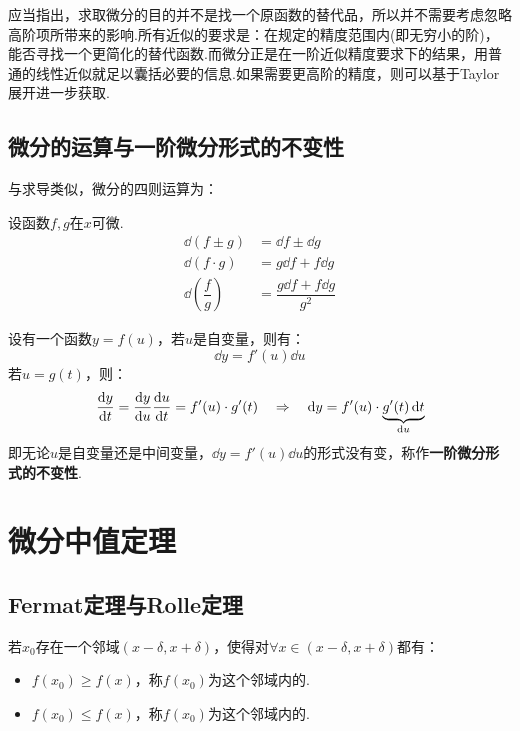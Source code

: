\begin{mistake}
    应当指出，求取微分的目的并不是找一个原函数的替代品，所以并不需要考虑忽略高阶项所带来的影响.所有近似的要求是：在规定的精度范围内(即无穷小的阶)，能否寻找一个更简化的替代函数.而微分正是在一阶近似精度要求下的结果，用普通的线性近似就足以囊括必要的信息.如果需要更高阶的精度，则可以基于Taylor展开进一步获取.
\end{mistake}


\subsection{微分的运算与一阶微分形式的不变性}
与求导类似，微分的四则运算为：
\begin{theorem}
    设函数$f,g$在$x$可微.
    \begin{align*}
        \dd{(f\pm g)} &= \dd{f} \pm \dd{g} \\
        \dd{(f \cdot g)} &= g\dd{f} + f\dd{g}\\
        \dd{\left(\dfrac{f}{g}\right)} &= \dfrac{g\dd{f} + f\dd{g}}{g^2}
    \end{align*}
\end{theorem}

设有一个函数$y=f(u)$，若$u$是自变量，则有：
\[\dd{y} = f'(u)\dd{u}\]
若$u=g(t)$，则：
\[\dv{y}{t} = \dv{y}{u}\dv{u}{t} = f'(u)\cdot g'(t) \quad\Rightarrow\quad \dd{y} = f'(u)\cdot \underbrace{g'(t)\dd{t}}_{\dd{u}}\]
即无论$u$是自变量还是中间变量，$\dd{y} = f'(u)\dd{u}$的形式没有变，称作\textbf{一阶微分形式的不变性}.


\section{微分中值定理}
\subsection{Fermat定理与Rolle定理}
\begin{definition}
    若$x_0$存在一个邻域$(x-\delta,x+\delta)$，使得对$\forall x \in (x-\delta,x+\delta)$都有：
    \begin{itemize}
        \item $f(x_0)\geqslant f(x)$，称$f(x_0)$为这个邻域内的.
        \item $f(x_0)\leqslant f(x)$，称$f(x_0)$为这个邻域内的.
    \end{itemize}
\end{definition}

